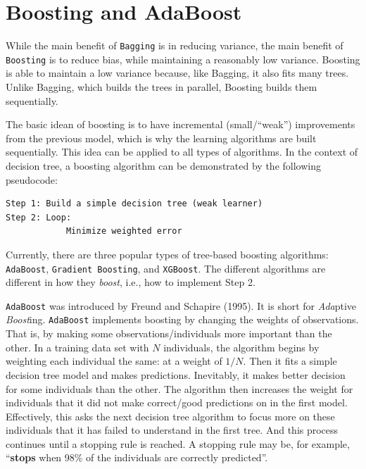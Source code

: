 \documentclass[
]{book}
\theoremstyle{definition}
\theoremstyle{definition}
\theoremstyle{definition}
\theoremstyle{definition}
\theoremstyle{remark}
\begin{document}
\hypertarget{boosting-and-adaboost}{%
\section{Boosting and AdaBoost}\label{boosting-and-adaboost}}

While the main benefit of \texttt{Bagging} is in reducing variance, the main benefit of \texttt{Boosting} is to reduce bias, while maintaining a reasonably low variance. Boosting is able to maintain a low variance because, like Bagging, it also fits many trees. Unlike Bagging, which builds the trees in parallel, Boosting builds them sequentially.

The basic idean of boosting is to have incremental (small/``weak'') improvements from the previous model, which is why the learning algorithms are built sequentially. This idea can be applied to all types of algorithms. In the context of decision tree, a boosting algorithm can be demonstrated by the following pseudocode:

\begin{verbatim}
Step 1: Build a simple decision tree (weak learner)
Step 2: Loop:
            Minimize weighted error
\end{verbatim}

Currently, there are three popular types of tree-based boosting algorithms: \texttt{AdaBoost}, \texttt{Gradient\ Boosting}, and \texttt{XGBoost}. The different algorithms are different in how they \emph{boost}, i.e., how to implement Step 2.

\texttt{AdaBoost} was introduced by Freund and Schapire (1995). It is short for \emph{Ada}ptive \emph{Boost}ing. \texttt{AdaBoost} implements boosting by changing the weights of observations. That is, by making some observations/individuals more important than the other. In a training data set with \(N\) individuals, the algorithm begins by weighting each individual the same: at a weight of \(1/N\). Then it fits a simple decision tree model and makes predictions. Inevitably, it makes better decision for some individuals than the other. The algorithm then increases the weight for individuals that it did not make correct/good predictions on in the first model. Effectively, this asks the next decision tree algorithm to focus more on these individuals that it has failed to understand in the first tree. And this process continues until a stopping rule is reached. A stopping rule may be, for example, ``\textbf{stops} when 98\% of the individuals are correctly predicted''.
\end{document}
